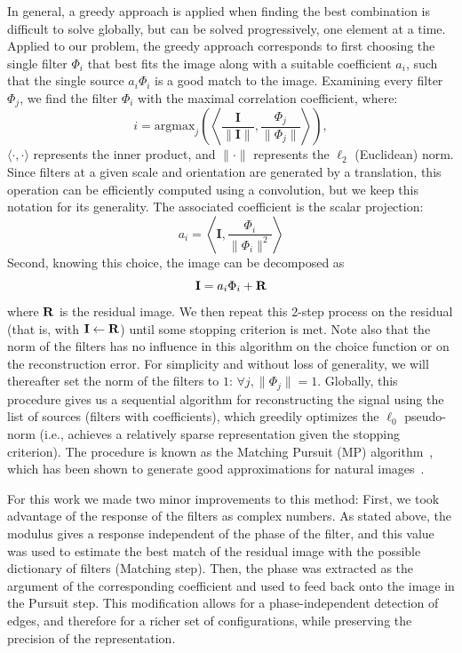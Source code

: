 \documentclass{article}
\begin{document}
In general, a greedy approach is applied when finding the best combination is
difficult to solve globally, but can be solved progressively,
one element at a time.
Applied to our problem, the greedy approach corresponds to first choosing
the single filter $\Phi_i$ that best fits the image along with a suitable coefficient $a_i$,
such that the single source $a_i\Phi_i$ is a good match to the image.
Examining every filter $\Phi_j$, we find the filter $\Phi_i$
with the maximal correlation coefficient, where:
\begin{equation}
i = \mbox{argmax}_j \left( \left\langle \frac{\mathbf{I}}{\| \mathbf{I} \|} , \frac{
\Phi_j}{\| \Phi_j\|} \right\rangle \right),
\label{eq:coco}
\end{equation}
$\langle \cdot,\cdot \rangle$ represents the inner product, and $\| \cdot \|$
represents the $\ell_2$ (Euclidean) norm. Since filters at a given scale and orientation
are generated by a translation, this operation can be efficiently computed using a convolution,
but we keep this notation for its generality.
The associated coefficient is the scalar projection:
\begin{equation}
a_{i} = \left\langle \mathbf{I} , \frac{ \Phi_{i}}{\| \Phi_{i}\|^2} \right\rangle
\label{eq:proj}
\end{equation}
Second, knowing this choice, the image can be
decomposed as
\begin{equation}
\mathbf{I} = a_{i} \Phi_{i} + \bf{R}
\label{eq:mp0} \end{equation}
where $\bf{R}$ is the residual image.
We then repeat this 2-step process on the residual (that is, with $\mathbf{I} \leftarrow \bf{R}$)
until some stopping criterion is met.
Note also that the norm of the filters has no influence in this algorithm
on the choice function or on the reconstruction error.
For simplicity and without loss of generality,
we will thereafter set the norm of the filters to $1$: $\forall j, \| \Phi_j \| =1$.
Globally, this procedure gives us a sequential algorithm for reconstructing the signal
using the list of sources (filters with coefficients), which greedily optimizes the $\ell_0$ pseudo-norm
(i.e., achieves a relatively sparse representation given the stopping criterion).
The procedure is known as the Matching Pursuit (MP) algorithm~\citep{Mallat93},
which has been shown to generate good approximations for natural images~\citep{Perrinet10shl}.

For this work we made two minor improvements to this method:
First, we took advantage of the response of the filters as complex numbers.
As stated above, the modulus gives a response independent of the phase of the filter,
and this value was used to estimate the best match of the residual image
with the possible dictionary of filters (Matching step).
Then, the phase was extracted as the argument of the corresponding coefficient
and used to feed back onto the image in the Pursuit step.
This modification allows for a phase-independent detection of edges,
and therefore for a richer set of configurations,
while preserving the precision of the representation.
\end{document}
